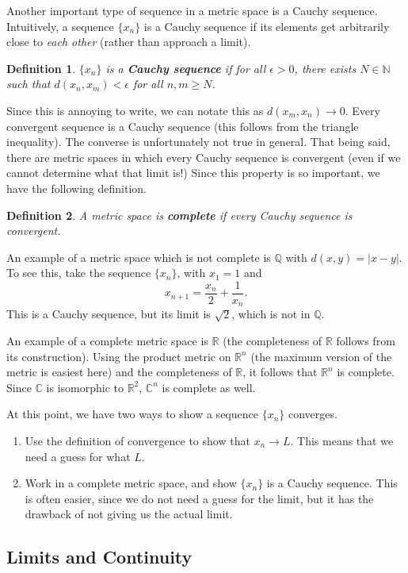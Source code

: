 \documentclass[12pt]{amsart}         %
\newtheorem{definition}{Definition}[section]
\theoremstyle{remark}
\newcommand{\N}{\mathbb{N}}
\newcommand{\C}{\mathbb{C}}
\newcommand{\R}{\mathbb{R}}
\newcommand{\Q}{\mathbb{Q}}
\begin{document}
Another important type of sequence in a metric space is a Cauchy sequence. Intuitively, a sequence $\{x_n\}$ is a Cauchy sequence if its elements get arbitrarily close to \emph{each other} (rather than approach a limit).
\begin{definition}
$\{x_n\}$ is a \textbf{Cauchy sequence} if for all $\epsilon > 0$, there exists $N \in \N$ such that $d(x_n, x_m) < \epsilon$ for all $n,m \geq N$.
\end{definition}
Since this is annoying to write, we can notate this as $d(x_m, x_n) \rightarrow 0$. Every convergent sequence is a Cauchy sequence (this follows from the triangle inequality). The converse is unfortunately not true in general. That being said, there are metric spaces in which every Cauchy sequence is convergent (even if we cannot determine what that limit is!) Since this property is so important, we have the following definition.

\begin{definition}A metric space is \textbf{complete} if every Cauchy sequence is convergent.
\end{definition}

An example of a metric space which is not complete is $\mathbb{Q}$ with $d(x,y) = |x-y|$. To see this, take the sequence $\{x_n\}$, with $x_1 = 1$ and 
\[
x_{n+1} = \frac{x_n}{2} + \frac{1}{x_n}.
\]
This is a Cauchy sequence, but its limit is $\sqrt{2}$, which is not in $\Q$.

An example of a complete metric space is $\R$ (the completeness of $\R$ follows from its construction). Using the product metric on $\R^n$ (the maximum version of the metric is easiest here) and the completeness of $\R$, it follows that $\R^n$ is complete. Since $\C$ is isomorphic to $\R^2$, $\C^n$ is complete as well.

At this point, we have two ways to show a sequence $\{x_n\}$ converges.
\begin{enumerate}
    \item Use the definition of convergence to show that $x_n \rightarrow L$. This means that we need a guess for what $L$.
    \item Work in a complete metric space, and show $\{x_n\}$ is a Cauchy sequence. This is often easier, since we do not need a guess for the limit, but it has the drawback of not giving us the actual limit.
\end{enumerate}

\subsection{Limits and Continuity}
\end{document}
